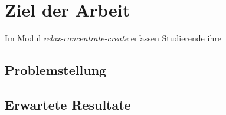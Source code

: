 
\section{Ziel der Arbeit}
\label{sec:ziel_der_arbeit}

Im Modul \textit{relax-concentrate-create} erfassen Studierende ihre 

\subsection{Problemstellung}
\label{sub:problemstellung}



\subsection{Erwartete Resultate}
\label{sub:erwartete_resultate}

